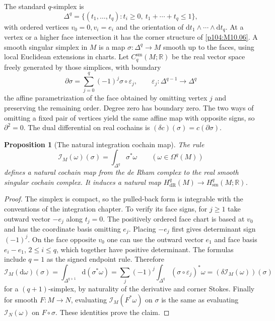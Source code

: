 \documentclass[11pt,oneside,openany]{book}
\newtheorem{proposition}[theorem]{Proposition}
\theoremstyle{definition}
\theoremstyle{remark}
\newcommand{\R}{\mathbb R}
\newcommand{\dd}{\mathrm d}
\begin{document}
The standard \(q\)-simplex is
\[
 \Delta^q=\{(t_1,\ldots,t_q):t_i\geq0,\ 
                         t_1+\cdots+t_q\leq1\},
\]
with ordered vertices \(v_0=0,v_i=e_i\) and the orientation of
\(\dd t_1\wedge\cdots\wedge\dd t_q\). At a vertex or a higher
face intersection it has the corner structure of
\cref{p104:M10.06}. A smooth singular simplex in \(M\) is a
map \(\sigma:\Delta^q\to M\) smooth up to the faces, using
local Euclidean extensions in charts. Let
\(C_q^{\mathrm{sm}}(M;\R)\) be the real vector space freely
generated by those simplices, with boundary
\[
 \partial\sigma=\sum_{j=0}^q(-1)^j\sigma\circ\varepsilon_j,
 \qquad
 \varepsilon_j:\Delta^{q-1}\longrightarrow\Delta^q
\]
the affine parametrization of the face obtained by omitting
vertex \(j\) and preserving the remaining order. Degree zero
has boundary zero. The two ways of omitting a fixed pair
of vertices yield the same affine map with opposite signs,
so \(\partial^2=0\). The dual differential on real cochains
is \((\delta c)(\sigma)=c(\partial\sigma)\).

\begin{proposition}[The natural integration cochain map]
\label{p104:M12.03}
The rule
\[
     \mathcal I_M(\omega)(\sigma)=\int_{\Delta^q}\sigma^*\omega
          \qquad(\omega\in\Omega^q(M))
\]
defines a natural cochain map from the de Rham complex to
the real smooth singular cochain complex. It induces a
natural map \(H_{\mathrm{dR}}^q(M)\to H_{\mathrm{sm}}^q(M;\R)\).
\end{proposition}
\begin{proof}
The simplex is compact, so the pulled-back form is
integrable with the conventions of the integration chapter.
To verify its face signs, for \(j\geq1\) take outward
vector \(-e_j\) along \(t_j=0\). The positively ordered
face chart is based at \(v_0\) and has the coordinate
basis omitting \(e_j\). Placing \(-e_j\) first gives
determinant sign \((-1)^j\). On the face opposite \(v_0\)
one can use the outward vector \(e_1\) and face basis
\(e_i-e_1\), \(2\leq i\leq q\), which together have
positive determinant. The formulas include \(q=1\)
as the signed endpoint rule. Therefore
\[
 \mathcal I_M(\dd\omega)(\sigma)
  =\int_{\Delta^{q+1}}\dd(\sigma^*\omega)
  =\sum_j(-1)^j\int_{\Delta^q}(\sigma\circ\varepsilon_j)^*\omega
  =(\delta\mathcal I_M(\omega))(\sigma)
\]
for a \((q+1)\)-simplex, by naturality of the derivative
and corner Stokes. Finally for smooth \(F:M\to N\),
evaluating \(\mathcal I_M(F^*\omega)\) on \(\sigma\)
is the same as evaluating \(\mathcal I_N(\omega)\) on
\(F\circ\sigma\). These identities prove the claim.
\end{proof}
\end{document}
